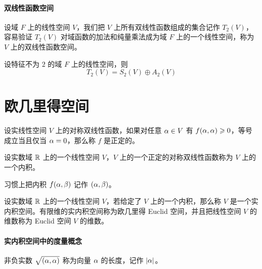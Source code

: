 \paragraph{双线性函数空间}

\begin{definition}
    设域 $F$ 上的线性空间 $V$，我们把 $V$ 上所有双线性函数组成的集合记作 $T_2(V)$，容易验证 $T_2(V)$ 对域函数的加法和纯量乘法成为域 $F$ 上的一个线性空间，称为 $V$ 上的双线性函数空间。
\end{definition}

\begin{theorem}
    设特征不为 $2$ 的域 $F$ 上的线性空间，则
    \[ T_2(V) = S_2(V) \oplus A_2(V) \]
\end{theorem}



\section{欧几里得空间}

\begin{definition}[正定的]
    设实线性空间 $V$ 上的对称双线性函数，如果对任意 $\alpha \in V$ 有 $f(\alpha,\alpha) \geqslant 0$，等号成立当且仅当 $\alpha = 0$，那么称 $f$ 是正定的。
\end{definition}

\begin{definition}[内积] 
    设实数域 $\mathbb{R}$ 上的一个线性空间 $V$，$V$ 上的一个正定的对称双线性函数称为 $V$ 上的一个内积。
\end{definition}

习惯上把内积 $f(\alpha,\beta)$ 记作 $(\alpha,\beta)$。

\begin{definition}
    设实数域 $\mathbb{R}$ 上的一个线性空间 $V$，若给定了 $V$ 上的一个内积，那么称 $V$ 是一个实内积空间。有限维的实内积空间称为欧几里得 Euclid 空间，并且把线性空间 $V$ 的维数称为 Euclid 空间 $V$ 的维数。
\end{definition}

\paragraph{实内积空间中的度量概念}

\begin{definition}
    非负实数 $\sqrt{(\alpha,\alpha)}$ 称为向量 $\alpha$ 的长度，记作 $|\alpha|$。
\end{definition}

